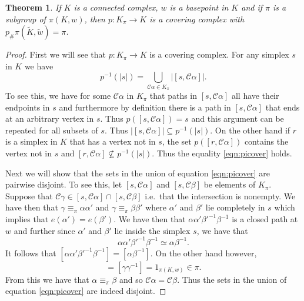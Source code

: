 \documentclass[12pt]{article}
\newtheorem{theorem}{Theorem}
\theoremstyle{definition}
\numberwithin{equation}{theorem}
\begin{document}
\begin{theorem}
  \label{thm:covering-fundamental}
  If $K$ is a connected complex, $w$ is a basepoint in $K$ and if $\pi$ is a subgroup of $\pi(K,w)$, then $p:K_{\pi}\rightarrow K$ is a covering complex with $p_{\#}\pi(\tilde{K},\tilde{w}) = \pi$.
\end{theorem}
\begin{proof}
  First we will see that $p:K_{\pi}\rightarrow K$ is a covering complex. For any simplex $s$ in $K$ we have
  \begin{equation}
    \label{eqn:picover}
    p^{-1}(|s|) = \bigcup_{\mathcal{C}\alpha \in K_{\pi}}|[s,\mathcal{C}\alpha]|.
  \end{equation}
  To see this, we have for some $\mathcal{C}\alpha$ in $K_{\pi}$ that paths in $[s,\mathcal{C}\alpha]$ all have their endpoints in $s$ and furthermore by definition there is a path in $[s,\mathcal{C}\alpha]$ that ends at an arbitrary vertex in $s$. Thus $p([s,\mathcal{C}\alpha]) = s$ and this argument can be repeated for all subsets of $s$. Thus $|[s,\mathcal{C}\alpha]| \subseteq p^{-1}(|s|)$. On the other hand if $r$ is a simplex in $K$ that has a vertex not in $s$, the set $p([r,\mathcal{C}\alpha])$ contains the vertex not in $s$ and $[r,\mathcal{C}\alpha] \not\subseteq p^{-1}(|s|)$. Thus the equality \ref{eqn:picover} holds.

  Next we will show that the sets in the union of equation \ref{eqn:picover} are pairwise disjoint. To see this, let $[s,\mathcal{C}\alpha]$ and $[s,\mathcal{C}\beta]$ be elements of $K_{\pi}$. Suppose that $\mathcal{C}\gamma \in [s,\mathcal{C}\alpha] \cap [s,\mathcal{C}\beta]$ i.e.\ that the intersection is nonempty. We have then that $\gamma \equiv_{\pi} \alpha\alpha'$ and $\gamma \equiv_{\pi} \beta\beta'$ where $\alpha'$ and $\beta'$ lie completely in $s$ which implies that $e(\alpha') = e(\beta')$. We have then that $\alpha\alpha'\beta'^{-1}\beta^{-1}$ is a closed path at $w$ and further since $\alpha'$ and $\beta'$ lie inside the simplex $s$, we have that
  \begin{equation*}
    \alpha\alpha'\beta'^{-1}\beta^{-1} \simeq \alpha\beta^{-1}.
  \end{equation*}
  It follows that $[\alpha\alpha'\beta'^{-1}\beta^{-1}] = [\alpha\beta^{-1}]$. On the other hand however,
  \begin{equation*}
    [\alpha\alpha'\beta'^{-1}\beta^{-1}] = [\gamma\gamma^{-1}] = 1_{\pi(K,w)} \in \pi.
  \end{equation*}
  From this we have that $\alpha \equiv_\pi \beta$ and so $\mathcal{C}\alpha = \mathcal{C}\beta$. Thus the sets in the union of equation \ref{eqn:picover} are indeed disjoint.


\end{proof}
\end{document}
